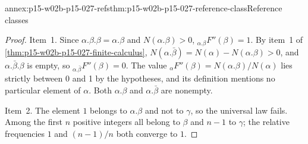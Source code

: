 \begin{annexitem}{annex:p15-w02b-p15-027-refs}{thm:p15-w02b-p15-027-reference-class}{Reference classes}
\begin{proof}
Item~1. Since \(\alpha.\beta.\beta=\alpha.\beta\) and
\(N(\alpha.\beta)>0\), \({}_{\alpha.\beta}F''(\beta)=1\). By item~1 of
\cref{thm:p15-w02b-p15-027-finite-calculus},
\(N(\alpha.\bar\beta)=N(\alpha)-N(\alpha.\beta)>0\), and
\(\alpha.\bar\beta.\beta\) is empty, so
\({}_{\alpha.\bar\beta}F''(\beta)=0\). The value
\({}_{\alpha}F''(\beta)=N(\alpha.\beta)/N(\alpha)\) lies strictly between
0 and 1 by the hypotheses, and its definition mentions no particular
element of \(\alpha\). Both \(\alpha.\beta\) and \(\alpha.\bar\beta\) are
nonempty.

Item~2. The element \(1\) belongs to \(\alpha.\beta\) and not to
\(\gamma\), so the universal law fails. Among the first \(n\) positive
integers all belong to \(\beta\) and \(n-1\) to \(\gamma\); the relative
frequencies \(1\) and \((n-1)/n\) both converge to \(1\).
\end{proof}
\end{annexitem}

